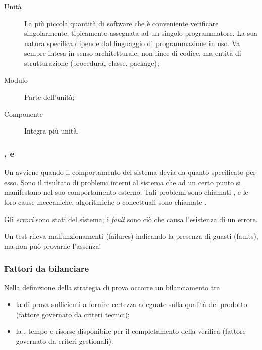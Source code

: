 \begin{description}
  \item[Unità] La più piccola quantità di software che è conveniente verificare
  singolarmente, tipicamente assegnata ad un singolo programmatore. La sua
  natura specifica dipende dal linguaggio di programmazione in uso. Va sempre
  intesa in senso architetturale: non linee di codice, ma entità di
  strutturazione (procedura, classe, package);
  \item[Modulo] Parte dell'unità;
  \item[Componente] Integra più unità.
\end{description}


\subsubsection{,  e }
\label{ssub:terminologia}

Un  avviene quando il comportamento del sistema devia da
quanto specificato per esso. Sono il risultato di problemi interni al sistema
che ad un certo punto si manifestano nel suo comportamento esterno. Tali
problemi sono chiamati , e le loro cause meccaniche, algoritmiche
o concettuali sono chiamate .

Gli \emph{errori} sono stati del sistema; i \emph{fault} sono ciò che causa
l'esistenza di un errore.

Un test rileva malfunzionamenti (failures) indicando la presenza di guasti
(faults), ma non può provarne l'assenza!


\subsubsection{Fattori da bilanciare}
\label{ssub:fattori_da_bilanciare}

Nella definizione della strategia di prova occorre un bilanciamento tra

\begin{itemize}
  \item la  di prova sufficienti a
    fornire certezza adeguate sulla qualità del prodotto (fattore
    governato da criteri tecnici);
  \item la , tempo e risorse
    disponibile per il completamento della verifica (fattore governato
    da criteri gestionali).
\end{itemize}

